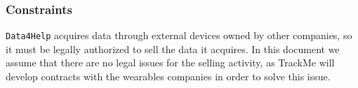     \subsubsection{Constraints}     

      \texttt{Data4Help} acquires data through external devices owned by other companies, so it must be legally authorized to sell the data it acquires. In this document we assume that there are no legal issues for the selling activity, as TrackMe will develop contracts with the wearables companies in order to solve this issue.
